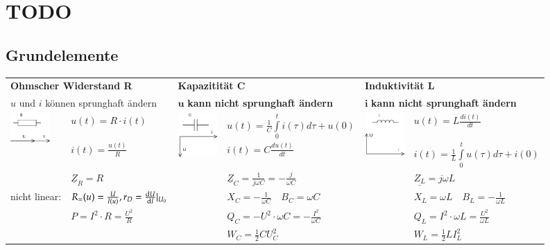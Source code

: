 \section{TODO}
   	\subsection{Grundelemente}
   	\begin{tabular}{p{1.5cm} p{4.3cm} |p{1.5cm} p{4.3cm}| p{1.5cm} p{4.3cm}}
   		\multicolumn{2}{l}{\textbf{Ohmscher Widerstand R}}
   		& \multicolumn{2}{l}{\textbf{Kapazitität C}}
   		& \multicolumn{2}{l}{\textbf{Induktivität L}} \\
   		\multicolumn{2}{l}{$u$ und $i$ können sprunghaft ändern}
   		& \multicolumn{2}{l}{$\mathbf{u}$ \textbf{kann nicht sprunghaft ändern}}
   		& \multicolumn{2}{l}{$\mathbf{i}$ \textbf{kann nicht sprunghaft ändern}} \\
   		
   		\multirow{2}{1.5cm}{
   			\includegraphics[width=1.5cm]{./images/zeigerdiag-r.png}}
   		& $u(t) = R \cdot i(t)$ 
   		& \multirow{2}{1.5cm}{\includegraphics[width=1.5cm]{./images/zeigerdiag-c.png}}
   		& $u(t) = \frac{1}{C} \int\limits_0^t i(\tau) d\tau + u(0)$
   		& 
   		\multirow{2}{1.5cm}{\includegraphics[width=1.5cm]{./images/zeigerdiag-l.png}}
   		&$u(t) = L \frac{di(t)}{dt}$\\
   		
   		&$i(t) = \frac{u(t)}{R}$
   		& & $i(t) = C \frac{d u(t)}{dt}$
   		& & $i(t) = \frac{1}{L} \int\limits_0^t u(\tau) d\tau + i(0)$\\
   		
   		& $\underline{Z}_R = R$
   		& & $\underline{Z}_C = \frac{1}{j \omega C} = - \frac{j}{\omega C}$
   		& & $\underline{Z_L} = j \omega L$\\
   		
   		\parbox{1.7cm}{\small{nicht linear:}}
   		& $R_=(u) = \frac{U}{I(u)}, r_D = \frac{\mathop{}\!\mathrm{d} U}{\mathop{}\!\mathrm{d} I}\lvert_{U_0}$
   		& & $X_C = -\frac{1}{\omega C} \quad B_C = \omega C$
   		& & $X_L = \omega L
   		\quad B_L = -\frac{1}{\omega L}$ \\
   		
   		& $P=I^2 \cdot R = \frac{U^2}{R}$
   		& & $Q_C= - U^2 \cdot \omega C = - \frac{I^2}{\omega C}$
   		& & $Q_L= I^2 \cdot \omega L = \frac{U^2}{\omega L}$\\
   		
   		& & & $W_C=\frac12 C U_C^2$
   		& &$W_L=\frac12 L I_L^2$
   	\end{tabular}

